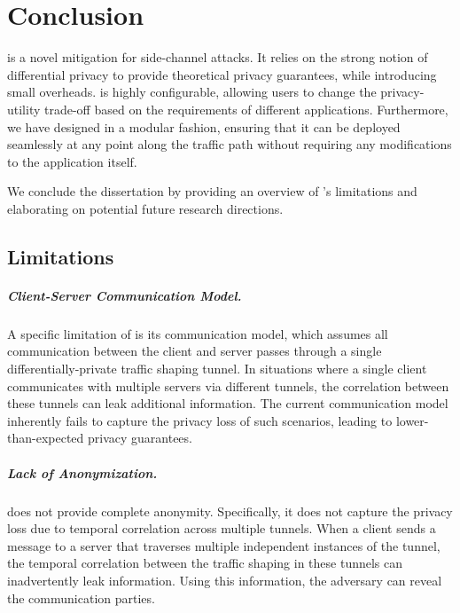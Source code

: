 \chapter{Conclusion}\label{ch:conclusion}
{\sys} is a novel mitigation for side-channel attacks. 
It relies on the strong notion of differential privacy to provide theoretical privacy guarantees, while introducing small overheads. 
{\sys} is highly configurable, allowing users to change the privacy-utility trade-off based on the requirements of different applications. 
Furthermore, we have designed {\sys} in a modular fashion, ensuring that it can be deployed seamlessly at any point along the traffic path without requiring any modifications to the application itself. 

We conclude the dissertation by providing an overview of {\sys}'s limitations and elaborating on potential future research directions.

\section{{\sys} Limitations}\label{sec:conclusion-limitations}
\paragraph{Client-Server Communication Model.}
A specific limitation of {\sys} is its communication model, which assumes all communication between the client and server passes through a single differentially-private traffic shaping tunnel.
In situations where a single client communicates with multiple servers via different tunnels, the correlation between these tunnels can leak additional information.
The current communication model inherently fails to capture the privacy loss of such scenarios, leading to lower-than-expected privacy guarantees.

\paragraph{Lack of Anonymization.}
{\sys} does not provide complete anonymity.
Specifically, it does not capture the privacy loss due to temporal correlation across multiple tunnels.
When a client sends a message to a server that traverses multiple independent instances of the {\sys} tunnel, the temporal correlation between the traffic shaping in these tunnels can inadvertently leak information. 
Using this information, the adversary can reveal the communication parties.

